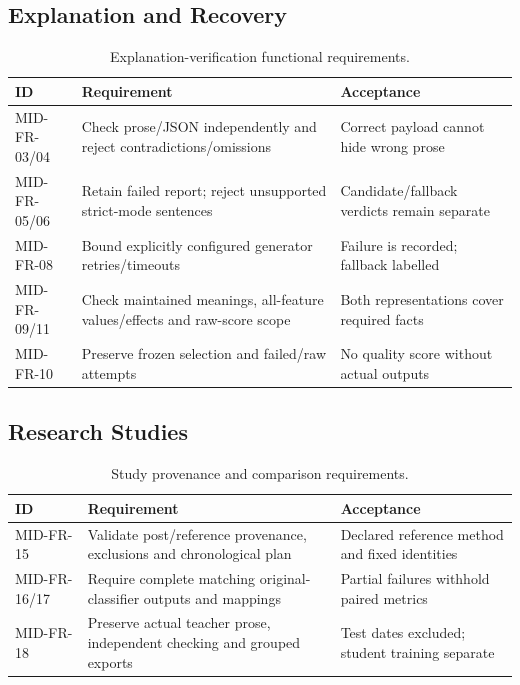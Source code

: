 \subsection{Explanation and Recovery}
\begin{longtable}{p{}p{}p{}}
\caption{Explanation-verification functional requirements.}\label{tab:fr-explain}\\\toprule ID & Requirement & Acceptance\\\midrule
MID-FR-03/04 & Check prose/JSON independently and reject contradictions/omissions & Correct payload cannot hide wrong prose\\
MID-FR-05/06 & Retain failed report; reject unsupported strict-mode sentences & Candidate/fallback verdicts remain separate\\
MID-FR-08 & Bound explicitly configured generator retries/timeouts & Failure is recorded; fallback labelled\\
MID-FR-09/11 & Check maintained meanings, all-feature values/effects and raw-score scope & Both representations cover required facts\\
MID-FR-10 & Preserve frozen selection and failed/raw attempts & No quality score without actual outputs\\
\bottomrule\end{longtable}
\subsection{Research Studies}
\begin{longtable}{p{}p{}p{}}
\caption{Study provenance and comparison requirements.}\label{tab:fr-study}\\\toprule ID & Requirement & Acceptance\\\midrule
MID-FR-15 & Validate post/reference provenance, exclusions and chronological plan & Declared reference method and fixed identities\\
MID-FR-16/17 & Require complete matching original-classifier outputs and mappings & Partial failures withhold paired metrics\\
MID-FR-18 & Preserve actual teacher prose, independent checking and grouped exports & Test dates excluded; student training separate\\
\bottomrule\end{longtable}

